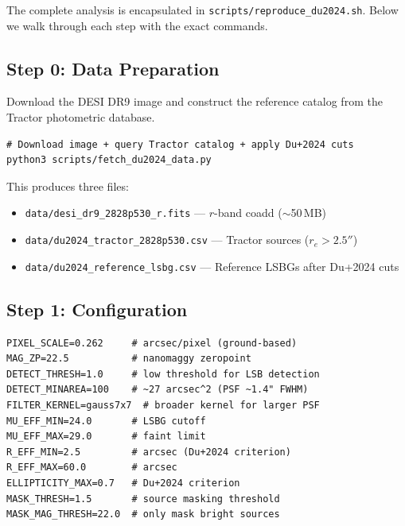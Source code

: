 \documentclass[11pt,fleqn]{book}
\begin{document}
The complete analysis is encapsulated in
\texttt{scripts/reproduce\_du2024.sh}.
Below we walk through each step with the exact commands.

\subsection{Step 0: Data Preparation}

Download the DESI DR9 image and construct the reference catalog from the
Tractor photometric database.

\begin{codebox}
\begin{lstlisting}[style=bash,numbers=none]
# Download image + query Tractor catalog + apply Du+2024 cuts
python3 scripts/fetch_du2024_data.py
\end{lstlisting}
\end{codebox}

\noindent
This produces three files:
\begin{itemize}
  \item \texttt{data/desi\_dr9\_2828p530\_r.fits} --- $r$-band coadd ($\sim$50\,MB)
  \item \texttt{data/du2024\_tractor\_2828p530.csv} --- Tractor sources ($r_e > 2.5''$)
  \item \texttt{data/du2024\_reference\_lsbg.csv} --- Reference LSBGs after Du+2024 cuts
\end{itemize}

\subsection{Step 1: Configuration}

\begin{codebox}
\begin{lstlisting}[style=bash,numbers=none]
PIXEL_SCALE=0.262     # arcsec/pixel (ground-based)
MAG_ZP=22.5           # nanomaggy zeropoint
DETECT_THRESH=1.0     # low threshold for LSB detection
DETECT_MINAREA=100    # ~27 arcsec^2 (PSF ~1.4" FWHM)
FILTER_KERNEL=gauss7x7  # broader kernel for larger PSF
MU_EFF_MIN=24.0       # LSBG cutoff
MU_EFF_MAX=29.0       # faint limit
R_EFF_MIN=2.5         # arcsec (Du+2024 criterion)
R_EFF_MAX=60.0        # arcsec
ELLIPTICITY_MAX=0.7   # Du+2024 criterion
MASK_THRESH=1.5       # source masking threshold
MASK_MAG_THRESH=22.0  # only mask bright sources
\end{lstlisting}
\end{codebox}
\end{document}
